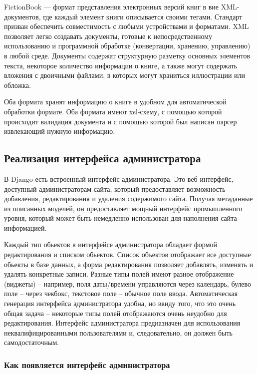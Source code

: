 \documentclass[a4paper]{report}
\begin{document}
FictionBook — формат представления электронных версий книг в вие XML-документов, где каждый элемент книги описывается своими тегами. Стандарт призван обеспечить совместимость с любыми устройствами и форматами. XML позволяет легко создавать документы, готовые к непосредственному использованию и программной обработке (конвертации, хранению, управлению) в любой среде. Документы содержат структурную разметку основных элементов текста, некоторое количество информации о книге, а также могут содержать вложения с двоичными файлами, в которых могут храниться иллюстрации или обложка.

Оба формата хранят информацию о книге в удобном для автоматической обработки формате. Оба формата имеют xsl-схему, с помощью которой происходит валидация документа и с помощью которой был написан парсер извлекающий нужную информацию.

\subsection{Реализация интерфейса администратора}

В Django есть встроенный интерфейс администратора. Это веб-интерфейс, доступный администраторам сайта, который предоставляет возможность добавления, редактирования и удаления содержимого сайта. Получая метаданные из описанных моделей, он предоставляет мощный интерфейс промышленного уровня, который может быть немедленно использован для наполнения сайта информацией.

Каждый тип обьектов в интерфейсе администратора обладает формой редактирования и списком обьектов. Список объектов отображает все доступные обьекты в базе данных, а форма редактирования позволяет добавлять, изменять и удалять конкретные записи. 
Разные типы полей имеют разное отображение (виджеты) -- например, поля даты/времени управляются через календарь, булево поле -- через чекбокс, текстовое поле -- обычное поле ввода. 
Автоматическая генерация интерфейса администратора удобна, но ввиду того, что это очень общая задача -- некоторые типы полей отображаются очень неудобно для редактирования. Интерфейс администратора предназначен для использования неквалифицированными пользователями и, следовательно, он должен быть самодостаточным.

\subsubsection{Как появляется интерфейс администратора}
\end{document}
